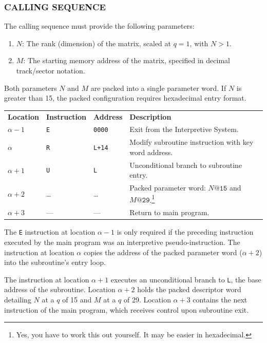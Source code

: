 \documentclass{article}
\begin{document}
\subsubsection*{CALLING SEQUENCE}
The calling sequence must provide the following parameters:
\begin{enumerate}[label=\arabic*., leftmargin=1.5em, itemsep=2pt]
    \item $N$: The rank (dimension) of the matrix, scaled at $q=1$, with $N > 1$.
    \item $M$: The starting memory address of the matrix, specified in decimal track/sector notation.
\end{enumerate}
Both parameters $N$ and $M$ are packed into a single parameter word. If $N$ is greater than 15, the packed configuration requires hexadecimal entry format. 

\medskip
\begin{center}
\begin{tabular}{llll}
\textbf{Location} & \textbf{Instruction} & \textbf{Address} & \textbf{Description} \\
$\alpha - 1$      & \texttt{E}            & \texttt{0000}    & Exit from the Interpretive System. \\
$\alpha$          & \texttt{R}            & \texttt{L+14}    & Modify subroutine instruction with key word address. \\
$\alpha + 1$      & \texttt{U}            & \texttt{L}       & Unconditional branch to subroutine entry. \\
$\alpha + 2$      & \dots                 & \dots            & Packed parameter word: $N\texttt{@15}$ and $M\texttt{@29}$.\footnote{Yes, you have to work this out yourself. It may be easier in hexadecimal.} \\
$\alpha + 3$      & ---                   & ---              & Return to main program.
\end{tabular}
\end{center}

\medskip
\noindent
The \texttt{E} instruction at location $\alpha - 1$ is only required if the preceding instruction executed by the main program was an interpretive pseudo-instruction. The instruction at location $\alpha$ copies the address of the packed parameter word ($\alpha + 2$) into the subroutine's entry loop. 

The instruction at location $\alpha + 1$ executes an unconditional branch to \texttt{L}, the base address of the subroutine. Location $\alpha + 2$ holds the packed descriptor word detailing $N$ at a $q$ of 15 and $M$ at a $q$ of 29. Location $\alpha + 3$ contains the next instruction of the main program, which receives control upon subroutine exit.
\end{document}
